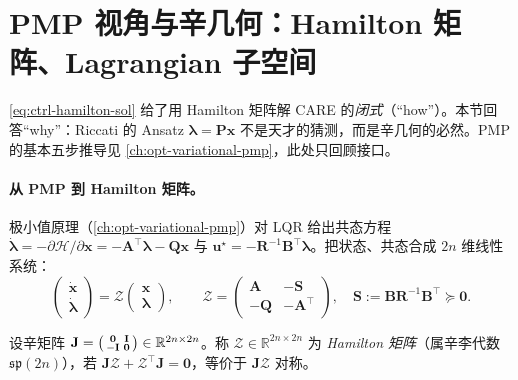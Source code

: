 \section{PMP 视角与辛几何：Hamilton 矩阵、Lagrangian 子空间}
\label{sec:lqr-symplectic}

\cref{eq:ctrl-hamilton-sol} 给了用 Hamilton 矩阵解 CARE 的\emph{闭式}（“how”）。本节回答“why”：Riccati 的 Ansatz $\boldsymbol\lambda=\mathbf P\mathbf x$ 不是天才的猜测，而是辛几何的必然。PMP 的基本五步推导见 \cref{ch:opt-variational-pmp}，此处只回顾接口。

\paragraph{从 PMP 到 Hamilton 矩阵。}
极小值原理（\cref{ch:opt-variational-pmp}）对 LQR 给出共态方程 $\dot{\boldsymbol\lambda}=-\partial\mathcal H/\partial\mathbf x=-\mathbf A^\top\boldsymbol\lambda-\mathbf Q\mathbf x$ 与 $\mathbf u^\star=-\mathbf R^{-1}\mathbf B^\top\boldsymbol\lambda$。把状态、共态合成 $2n$ 维线性系统：
\begin{equation}
  \begin{pmatrix}\dot{\mathbf x}\\\dot{\boldsymbol\lambda}\end{pmatrix}
  =\mathcal Z\begin{pmatrix}\mathbf x\\\boldsymbol\lambda\end{pmatrix},\qquad
  \mathcal Z=\begin{pmatrix}\mathbf A&-\mathbf S\\-\mathbf Q&-\mathbf A^\top\end{pmatrix},\quad \mathbf S:=\mathbf B\mathbf R^{-1}\mathbf B^\top\succeq\mathbf0.
  \label{eq:lqr-Z}
\end{equation}

\begin{definition}\label{def:lqr-hamiltonian}
设辛矩阵 $\mathbf J=\begin{psmallmatrix}\mathbf0&\mathbf I\\-\mathbf I&\mathbf0\end{psmallmatrix}\in\mathbb R^{2n\times2n}$。称 $\mathcal Z\in\mathbb R^{2n\times2n}$ 为 \emph{Hamilton 矩阵}（属辛李代数 $\mathfrak{sp}(2n)$），若 $\mathbf J\mathcal Z+\mathcal Z^\top\mathbf J=\mathbf0$，等价于 $\mathbf J\mathcal Z$ 对称。
\end{definition}

